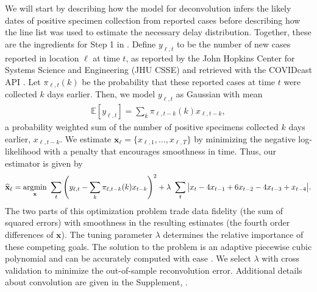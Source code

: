 We will start by describing how the model for deconvolution infers the likely
dates of positive specimen collection from reported cases before describing how
the line list was used to estimate the necessary delay distribution. Together,
these are the ingredients for Step 1 in .
Define $y_{\ell,t}$ to be the number of new cases reported in location $\ell$ at
time $t$, as reported by the John Hopkins Center for Systems Science and
Engineering (JHU CSSE)\citealp{dong2020interactive} and retrieved with the
COVIDcast API \citep{reinhart2021open}. Let $\pi_{\ell,t}(k)$ be the probability
that these reported cases at time $t$ were collected $k$ days earlier. Then, we
model $y_{\ell,t}$ as Gaussian with mean 
\begin{align}
  \label{eq:cases-model}
  \mathbb{E}[y_{\ell,t}] =\sum_{k} \pi_{\ell,t-k}(k)x_{\ell,t-k},
\end{align}
a probability weighted sum of the number of positive specimens
collected $k$ days earlier, $x_{\ell,t-k}$.
We estimate $\mathbf{x}_\ell = \{x_{\ell,1},\ldots,x_{\ell,T}\}$ by minimizing
the negative log-likelihood with a penalty that encourages smoothness in time.
Thus, our estimator is given by
\begin{align}
  \label{eq:cases-deconvolved}
  \widehat{\mathbf{x}}_\ell = \operatorname*{argmin}_{\mathbf{x}}\ \sum_{t}
  \left( y_{\ell,t} -  \sum_k \pi_{\ell,t-k}(k) x_{t-k} \right)^2 
  + \lambda\ \sum_t \big|x_t - 4x_{t-1} + 6x_{t-2} -4x_{t-3}+ x_{t-4}\big|.
\end{align}
The two parts of this optimization problem trade data fidelity (the sum of
squared errors) with smoothness in the resulting estimates (the fourth order
differences of $\mathbf{x}$). The tuning parameter $\lambda$ determines the
relative importance of these competing goals. The solution to the problem is an
adaptive piecewise cubic polynomial \citep{tibshirani2014adaptive,
tibshirani2022divided} and can be accurately computed with ease
\citep{ramdas2016fast,jahja2022real}. We select $\lambda$ with cross validation
to minimize the out-of-sample reconvolution error. Additional details about
convolution are given in the Supplement, .


